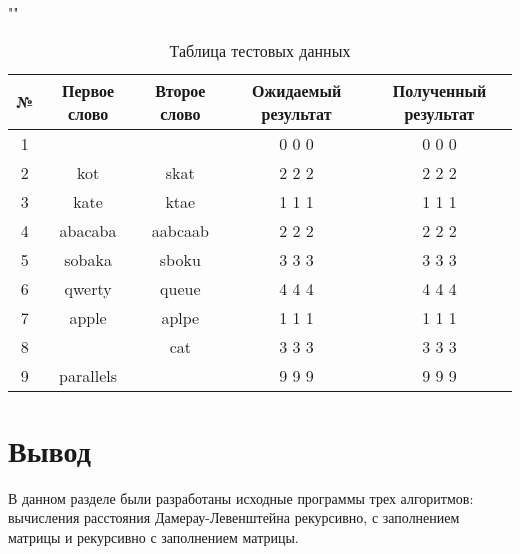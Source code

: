 \begin{table}[h]
    \begin{center}
        \caption{Таблица тестовых данных}
        \label{tab:o}
        ""\newline
        \begin{tabular}{|c c c c c|}
            \hline
            № & Первое слово & Второе слово & Ожидаемый результат & Полученный результат \\ [0.8ex]
            \hline
            1 &  &  & 0 0 0 & 0 0 0\\
            \hline
            2 & kot & skat & 2 2 2 & 2 2 2\\
            \hline
            3 & kate & ktae & 1 1 1 & 1 1 1\\
            \hline
            4 & abacaba & aabcaab & 2 2 2 & 2 2 2\\
            \hline
            5 & sobaka & sboku & 3 3 3 & 3 3 3\\
            \hline
            6 & qwerty & queue & 4 4 4 & 4 4 4\\
            \hline
            7 & apple & aplpe & 1 1 1  & 1 1 1\\
            \hline
            8 &  & cat & 3 3 3 & 3 3 3\\
            \hline
            9 & parallels &  & 9 9 9 & 9 9 9\\
            \hline
        \end{tabular}
    \end{center}
\end{table}

\section*{Вывод}

В данном разделе были разработаны исходные программы трех алгоритмов:
вычисления расстояния Дамерау-Левенштейна рекурсивно, с заполнением матрицы и рекурсивно с заполнением матрицы.